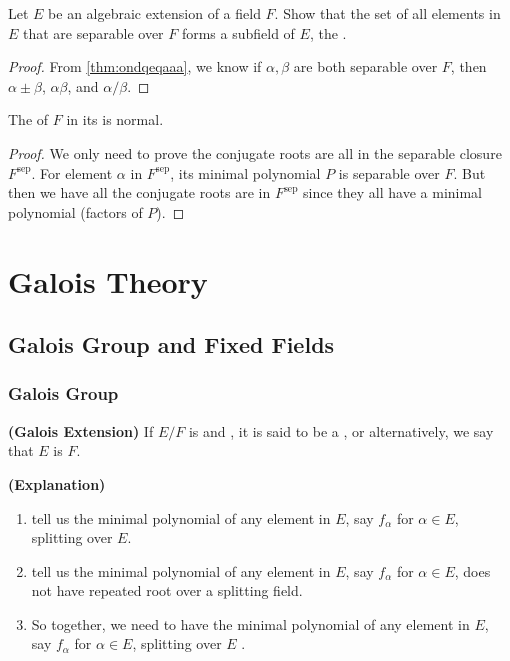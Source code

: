 \documentclass{article}
\newcommand{\bfs}[1]{\textbf{({#1}) }}
\begin{document}
\begin{lema}
Let $E$ be an algebraic extension of a field $F$. Show that the set of all elements in $E$ that are separable over $F$ forms a subfield of $E$, the .
\end{lema} 
\begin{proof}
From \cref{thm:ondqeqaaa}, we know if $\alpha, \beta$ are both separable over $F$, then $\alpha \pm \beta$, $\alpha \beta$, and $\alpha / \beta$. 
\end{proof}
\begin{cora}\label{cor:ttqre}
The  of $F$ in its  is normal.
\end{cora}
\begin{proof}
We only need to prove the conjugate roots are all in the separable closure $F^{\text{sep}}$.  For element $\alpha$ in $F^{\text{sep}}$, its minimal polynomial $P$ is separable over $F$. But then we have all the  conjugate roots are in $F^{\text{sep}}$ since they all have a minimal polynomial (factors of $P$). 
\end{proof}

\section{Galois Theory}
\subsection{Galois Group and Fixed Fields}
\subsubsection{Galois Group}
\begin{defa}\bfs{Galois Extension}
  If $E / F$ is  and , it is said to be a , or alternatively, we say that $E$ is  $F$.
\end{defa}
\begin{rema}\bfs{Explanation}
\begin{enumerate}
    \item {} tell us the minimal polynomial of any element in $E$, say $f_\alpha$ for $\alpha\in E$, splitting over $E$.
    \item {} tell us the minimal polynomial of any element in $E$, say $f_\alpha$ for $\alpha\in E$, does not have repeated root over a splitting  field.
    \item So together, we need  to have the minimal polynomial of any element in $E$, say $f_\alpha$ for $\alpha\in E$, splitting over $E$ .
\end{enumerate}

\end{rema}
\end{document}
